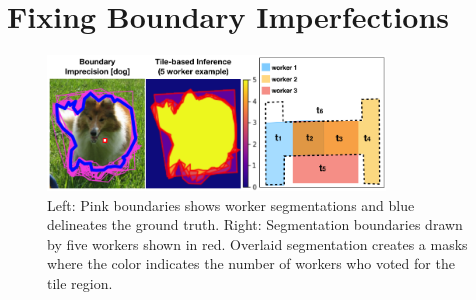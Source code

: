 \section{Fixing Boundary Imperfections\label{sec:precision}}%
\begin{figure}[h!]
\vspace{-10pt}
\centering
\includegraphics[width=0.8\textwidth]{plots/precision_issue_tile_example.png}
\caption{Left: Pink boundaries shows worker segmentations and blue delineates the ground truth. Right: Segmentation boundaries drawn by five workers shown in red. Overlaid segmentation creates a masks where the color indicates the number of workers who voted for the tile region.}
\label{tile_demo}
\end{figure}
